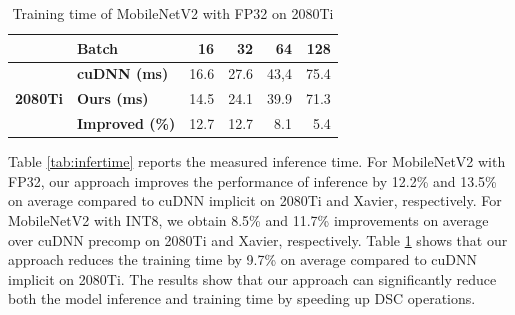 \begin{table}[]

    \caption{Training time of MobileNetV2 with FP32 on 2080Ti}
    \vspace{-3mm}
    \label{tab:traintime}
    \centering
    \begin{threeparttable}
    \begin{tabular}{c|l|rrrr}
    \toprule
    &\textbf{Batch} & 16& 32 &64 & 128\\
    \midrule
    \multirow{3}{*}{\textbf{2080Ti}}&\textbf{cuDNN (ms)} & 16.6 & 27.6 & 43,4 &75.4 \\
    &\textbf{Ours (ms)} & 14.5  &24.1 &39.9 &71.3\\
    &\textbf{Improved (\%)} &12.7  &12.7 &8.1 &5.4 \\
    \bottomrule
    \end{tabular}
    \footnotesize
    \end{threeparttable}
    \vspace{-5mm}
\end{table}
Table \ref{tab:infertime} reports the measured inference time. For MobileNetV2 with FP32, our approach improves the performance of
inference by 12.2\% and 13.5\% on average compared to cuDNN implicit on 2080Ti and Xavier, respectively. For MobileNetV2 with INT8, we
obtain 8.5\% and 11.7\% improvements on average over cuDNN precomp on 2080Ti and Xavier, respectively. Table \ref{tab:traintime} shows that
our approach reduces the training time by 9.7\% on average compared to cuDNN implicit on 2080Ti. The results show that our approach can
significantly reduce both the model inference and training time by speeding up DSC operations.
